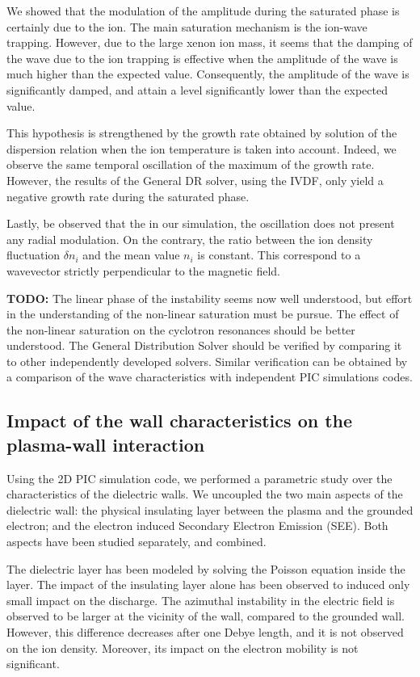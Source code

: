 We showed that the modulation of the amplitude during the saturated phase is certainly due to the ion.
The main saturation mechanism is the ion-wave trapping.
However, due to the large xenon ion mass, it seems that the damping of the wave due to the ion trapping is effective when the amplitude of the wave is much higher than the expected value.
Consequently, the amplitude of the wave is significantly damped, and attain a level significantly lower than the expected value.

This hypothesis is strengthened by the growth rate obtained by solution of the dispersion relation when the ion temperature is taken into account.
Indeed, we observe the same temporal oscillation of the maximum of the  growth rate.
However, the results of the General DR solver, using the IVDF, only yield a negative growth rate during the saturated phase.

Lastly, be observed that the in our simulation, the oscillation does not present any radial modulation.
On the contrary, the ratio between the ion density fluctuation $\delta n_i$ and the mean value $n_i$ is constant. 
This correspond to a wavevector strictly perpendicular to the magnetic field.

{\bf TODO:} The linear phase of the instability seems now well understood, but effort in the understanding of the non-linear saturation must be pursue.
The effect of the non-linear saturation on the cyclotron resonances should be better understood.
The General Distribution Solver should be verified by comparing it to other independently developed solvers.
Similar verification can be obtained by a comparison of the wave characteristics with independent PIC simulations codes.

\subsection{Impact of the wall characteristics on the plasma-wall interaction }
Using the 2D PIC simulation code, we performed a parametric study over the characteristics of the dielectric walls.
We uncoupled the two main aspects of the dielectric wall\string: the physical insulating layer between the plasma and the grounded electron; and the electron induced Secondary Electron Emission (SEE).
Both aspects have been studied separately, and combined.

The dielectric layer has been modeled by solving the Poisson equation inside the layer.
The impact of the insulating layer alone has been observed to induced only small impact on the discharge.
The azimuthal instability in the electric field is observed to be larger at the vicinity of the wall, compared to the grounded wall.
However, this difference decreases after one Debye length, and it is not observed on the ion density.
Moreover, its impact on the electron mobility is not significant.

